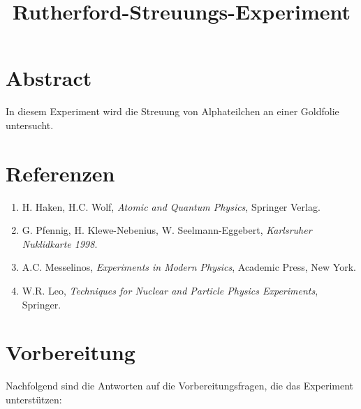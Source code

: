 \documentclass[a4paper,12pt]{article}
\begin{document}
\title{Rutherford-Streuungs-Experiment}
\author{}
\date{}

\maketitle

\section*{Abstract}
In diesem Experiment wird die Streuung von Alphateilchen an einer Goldfolie untersucht.

\section*{Referenzen}
\begin{enumerate}
    \item H. Haken, H.C. Wolf, \textit{Atomic and Quantum Physics}, Springer Verlag.
    \item G. Pfennig, H. Klewe-Nebenius, W. Seelmann-Eggebert, \textit{Karlsruher Nuklidkarte 1998}.
    \item A.C. Messelinos, \textit{Experiments in Modern Physics}, Academic Press, New York.
    \item W.R. Leo, \textit{Techniques for Nuclear and Particle Physics Experiments}, Springer.
\end{enumerate}

\section*{Vorbereitung}
Nachfolgend sind die Antworten auf die Vorbereitungsfragen, die das Experiment unterstützen:
\end{document}
